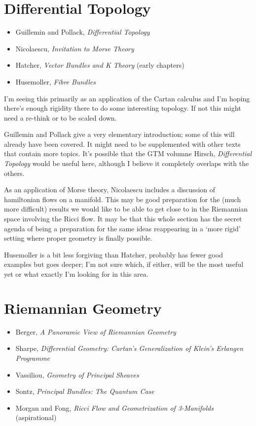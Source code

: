\documentclass[article]{article}
\begin{document}
\section{Differential Topology}

\begin{itemize}
	\item{Guillemin and Pollack, \textit{Differential Topology}}
	\item{Nicolaescu, \textit{Invitation to Morse Theory}}
	\item{Hatcher, \textit{Vector Bundles and K Theory} (early chapters)}
	\item{Husemoller, \textit{Fibre Bundles}}
\end{itemize}

I'm seeing this primarily as an application of the Cartan calculus and I'm hoping there's enough rigidity there to do some interesting topology. If not this might need a re-think or to be scaled down.

Guillemin and Pollack give a very elementary introduction; some of this will already have been covered. It might need to be supplemented with other texts that contain more topics. It's possible that the GTM volumne Hirsch, \textit{Differential Topology} would be useful here, although I believe it completely overlaps with the others.

As an application of Morse theory, Nicolaescu includes a discussion of hamiltonian flows on a manifold. This may be good preparation for the (much more difficult) results we would like to be able to get close to in the Riemannian space involving the Ricci flow. It may be that this whole section has the secret agenda of being a preparation for the same ideas reappearing in a `more rigid' setting where proper geometry is finally possible.

Husemoller is a bit less forgiving than Hatcher, probably has fewer good examples but goes deeper; I'm not sure which, if either, will be the most useful yet or what exactly I'm looking for in this area.

\section{Riemannian Geometry}

\begin{itemize}
	\item{Berger, \textit{A Panoramic View of Riemannian Geometry}}
	\item{Sharpe, \textit{Differential Geometry: Cartan’s Generalization of Klein’s Erlangen Programme}}
	\item{Vassiliou, \textit{Geometry of Principal Sheaves}}
	\item{Sontz, \textit{Principal Bundles: The Quantum Case}}
	\item{Morgan and Fong, \textit{Ricci Flow and Geometrization of 3-Manifolds} (aspirational)}
\end{itemize}
\end{document}
